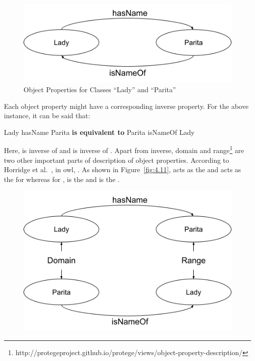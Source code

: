 \begin{doublespace}
\begin{figure}[htp]
    \centering
    \includegraphics[width=15cm]{images/ch4/Figure10.png}
    \caption{Object Properties for Classes \enquote{Lady} and \enquote{Parita}}
    \label{fig:4.10}
\end{figure}
\par Each object property might have a corresponding inverse property. For the above instance, it can be said that:
\begin{center}
    \par Lady hasName Parita \textbf{is equivalent to} Parita isNameOf Lady
\end{center}
Here,  is inverse of  and  is inverse of . Apart from inverse, domain and range\footnote{http://protegeproject.github.io/protege/views/object-property-description/} are two other important parts of description of object properties. According to Horridge et al.~\cite{horridge2009practical}, in \ac{owl}, . As shown in Figure~\ref{fig:4.11},  acts as the  and  acts as the  for  whereas for ,  is the  and  is the . 
\begin{figure}[htp]
    \centering
    \includegraphics[width=12cm]{images/ch4/Figure11.png}

\end{figure}
\end{doublespace}
